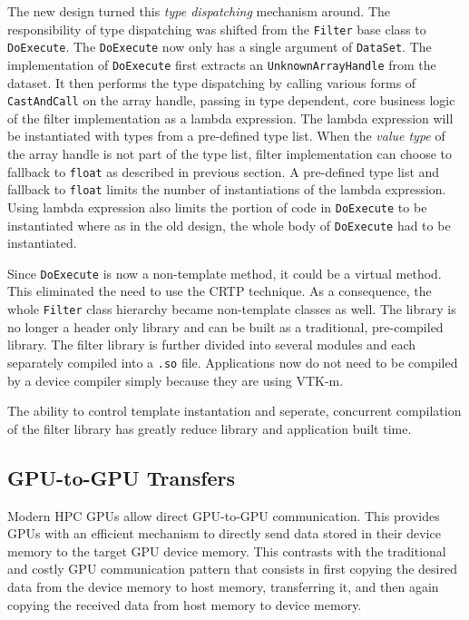 The new design turned this \emph{type dispatching} mechanism around. The responsibility of type dispatching was shifted from the \texttt{Filter} base class to \texttt{DoExecute}. The \texttt{DoExecute} now only has a single argument of \texttt{DataSet}. The implementation of \texttt{DoExecute} first extracts an \texttt{UnknownArrayHandle} from the dataset. It then performs the type dispatching by calling various forms of \texttt{CastAndCall} on the array handle, passing in type dependent, core business logic of the filter implementation as a lambda expression. The lambda expression will be instantiated with types from a pre-defined type list. When the \emph{value type} of the array handle is not part of the type list, filter implementation can choose to fallback to \texttt{float} as described in previous section. A pre-defined type list and fallback to \texttt{float} limits the number of instantiations of the lambda expression. Using lambda expression also limits the portion of code in \texttt{DoExecute} to be instantiated where as in the old design, the whole body of \texttt{DoExecute} had to be instantiated.

Since \texttt{DoExecute} is now a non-template method, it could be a virtual method. This eliminated the need to use the CRTP technique. As a consequence, the whole \texttt{Filter} class hierarchy became non-template classes as well. The library is no longer a header only library and can be built as a traditional, pre-compiled library. The filter library is further divided into several modules and each separately compiled into a \texttt{.so} file. Applications now do not need to be compiled by a device compiler simply because they are using VTK-m.

The ability to control template instantation and seperate, concurrent compilation of the filter library has greatly reduce library and application built time. 

\subsection{GPU-to-GPU Transfers}

Modern HPC GPUs allow direct GPU-to-GPU communication. This provides GPUs with an efficient mechanism to directly send data stored in their device memory to the target GPU device memory. This contrasts with the traditional and costly GPU communication pattern that consists in first copying the desired data from the device memory to host memory, transferring it, and then again copying the received data from host memory to device memory.

